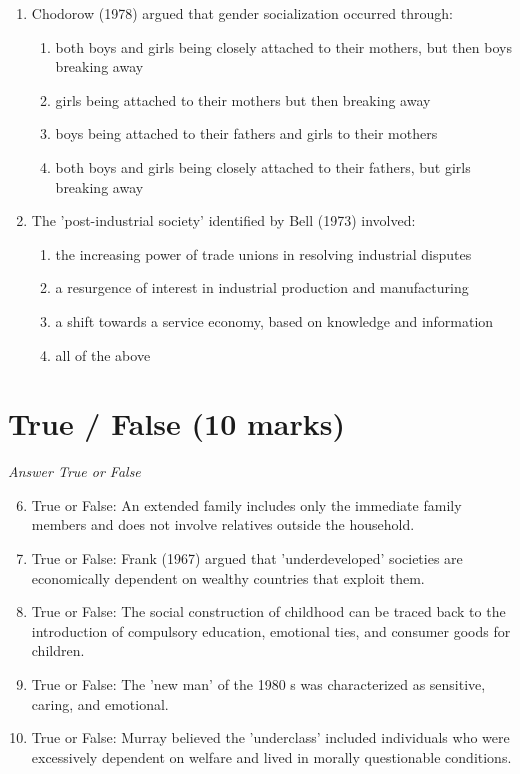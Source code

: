 \documentclass[12pt]{article}
\begin{document}
\begin{enumerate}[label=\arabic*.]
\item Chodorow (1978) argued that gender socialization occurred through:
\begin{enumerate}[label=(\alph*)]
    \item both boys and girls being closely attached to their mothers, but then boys breaking away
    \item girls being attached to their mothers but then breaking away
    \item boys being attached to their fathers and girls to their mothers
    \item both boys and girls being closely attached to their fathers, but girls breaking away
\end{enumerate}
\item The 'post-industrial society' identified by Bell (1973) involved:
\begin{enumerate}[label=(\alph*)]
    \item the increasing power of trade unions in resolving industrial disputes
    \item a resurgence of interest in industrial production and manufacturing
    \item a shift towards a service economy, based on knowledge and information
    \item all of the above
\end{enumerate}
\end{enumerate}

\section*{True / False (10 marks)}
\textit{Answer True or False}
\begin{enumerate}[label=\arabic*.]
\setcounter{enumi}{5}
\item True or False: An extended family includes only the immediate family members and does not involve relatives outside the household.
\item True or False: Frank (1967) argued that 'underdeveloped' societies are economically dependent on wealthy countries that exploit them.
\item True or False: The social construction of childhood can be traced back to the introduction of compulsory education, emotional ties, and consumer goods for children.
\item True or False: The 'new man' of the 1980 s was characterized as sensitive, caring, and emotional.
\item True or False: Murray believed the 'underclass' included individuals who were excessively dependent on welfare and lived in morally questionable conditions.
\end{enumerate}
\end{document}
